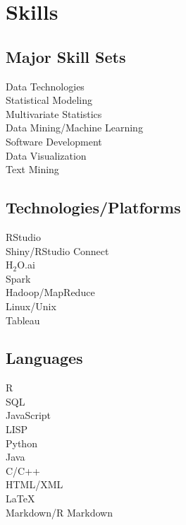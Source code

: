 \documentclass[letterpaper]{deedy-resume} %
\begin{document}
\begin{minipage}[t]{0.35\textwidth}

\section{Skills}
\subsection{Major Skill Sets}
Data Technologies\\
Statistical Modeling\\
Multivariate Statistics\\
Data Mining/Machine Learning\\
Software Development\\
Data Visualization\\
Text Mining\\

\sectionspace %
\vspace{3pt}
\subsection{Technologies/Platforms}
RStudio\\
Shiny/RStudio Connect\\
H$_2$O.ai\\
Spark\\
Hadoop/MapReduce\\
Linux/Unix\\
Tableau

\sectionspace %
\vspace{3pt}
\subsection{Languages}
R\\
SQL\\
\vspace{3pt}
JavaScript\\
LISP\\
Python\\
Java\\
C/C++\\
\vspace{3pt}
HTML/XML\\
\LaTeX\\
Markdown/R Markdown



\end{minipage} %
\end{document}
